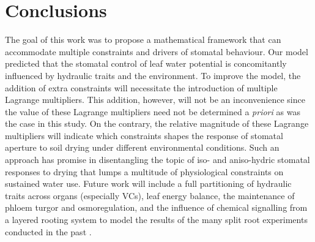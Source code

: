 \documentclass[utf8]{frontiersSCNS} %
\begin{document}
\section{Conclusions}
The goal of this work was to propose a mathematical framework that can accommodate multiple constraints and drivers of stomatal behaviour. Our model predicted that the stomatal control of leaf water potential is concomitantly influenced by hydraulic traits and the environment. To improve the model, the addition of extra constraints will necessitate the introduction of multiple Lagrange multipliers. This addition, however, will not be an inconvenience since the value of these Lagrange multipliers need not be determined a \textit{priori} as was the case in this study. On the contrary, the relative magnitude of these Lagrange multipliers will indicate which constraints shapes the response of stomatal aperture to soil drying under different environmental conditions. Such an approach has promise in disentangling the topic of iso- and aniso-hydric stomatal responses to drying that lumps a multitude of physiological constraints on sustained water use.   Future work will include a full partitioning of  hydraulic traits across organs (especially VCs), leaf energy balance, the maintenance of phloem turgor and osmoregulation, and the influence of chemical signalling from a layered rooting system to model the results of the many split root experiments conducted in the past \citep{blackman1985root, zhang1987control}. 






\end{document}
